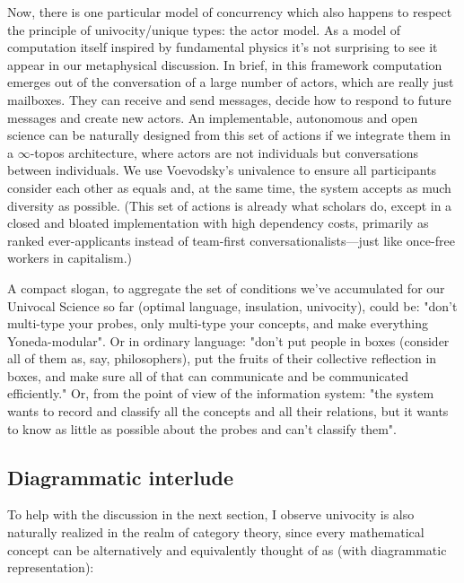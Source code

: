 \documentclass[11pt]{article}
\begin{document}
Now, there is one particular model of concurrency which also happens to respect the
principle of univocity/unique types: the actor model. As a model of computation itself
inspired by fundamental physics it's not surprising to see it appear in our metaphysical
discussion. In brief, in this framework computation emerges out of the conversation of a
large number of actors, which are really just mailboxes. They can receive and send
messages, decide how to respond to future messages and create new actors. An
implementable, autonomous and open science can be naturally designed from this set of
actions if we integrate them in a \(\infty\)-topos architecture, where actors are not
individuals but conversations between individuals. We use Voevodsky's univalence to
ensure all participants consider each other as equals and, at the same time, the system
accepts as much diversity as possible. (This set of actions is already what scholars do,
except in a closed and bloated implementation with high dependency costs, primarily as
ranked ever-applicants instead of team-first conversationalists---just like once-free
workers in capitalism.)

A compact slogan, to aggregate the set of conditions we've accumulated for our Univocal
Science so far (optimal language, insulation, univocity), could be: "don't multi-type
your probes, only multi-type your concepts, and make everything Yoneda-modular". Or in
ordinary language: "don't put people in boxes (consider all of them as, say,
philosophers), put the fruits of their collective reflection in boxes, and make sure all
of that can communicate and be communicated efficiently." Or, from the point of view of
the information system: "the system wants to record and classify all the concepts and
all their relations, but it wants to know as little as possible about the probes and
can't classify them".

\subsection*{Diagrammatic interlude}

To help with the discussion in the next section, I observe univocity is also naturally
realized in the realm of category theory, since every mathematical concept can be
alternatively and equivalently thought of as (with diagrammatic representation):
\end{document}
